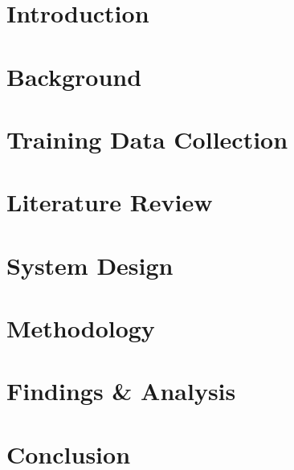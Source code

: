 \begin{abstract}
	
\end{abstract}

\section{Introduction}

\section{Background}

\section{Training Data Collection}

\section{Literature Review}

\section{System Design}

\section{Methodology}

\section{Findings \& Analysis}

\section{Conclusion}